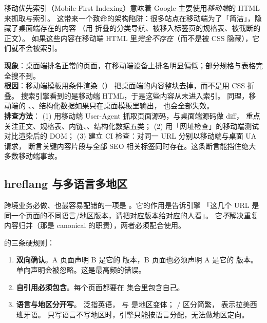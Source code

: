 移动优先索引（Mobile-First Indexing）意味着 Google 主要使用\emph{移动端}的 HTML 来抓取与索引。
这带来一个致命的架构陷阱：很多站点在移动端为了「简洁」，隐藏了桌面端存在的内容
（用  折叠的分类导航、被移入标签页的规格表、被截断的正文）。
如果这些内容在移动端 HTML 里\emph{完全不存在}（而不是被 CSS 隐藏），它们就不会被索引。

\begin{pitfall}
\textbf{现象}：桌面端排名正常的页面，在移动端设备上排名明显偏低；部分规格与表格完全搜不到。\\
\textbf{根因}：移动端模板用条件渲染（）
把桌面端的内容整块去掉，而不是用 CSS 折叠。
搜索引擎看到的是移动端 HTML，于是这些内容从未进入索引。
同理，移动端的 、、结构化数据如果只在桌面模板里输出，
也会全部失效。\\
\textbf{排查方法}：
(1) 用移动端 User-Agent 抓取页面源码，与桌面端源码做 diff，
      重点关注正文、规格表、内链、、结构化数据五类；
(2) 用「网址检查」的移动端测试对比渲染后的 DOM；
(3) 建立 CI 检查：对同一 URL 分别以移动端与桌面 UA 请求，
      断言关键内容片段与全部 SEO 相关标签同时存在。这条断言能挡住绝大多数移动端事故。
\end{pitfall}

\subsection{hreflang 与多语言多地区}

跨境业务必做、也最容易配错的一项是 。它的作用是告诉引擎
「这几个 URL 是同一个页面的不同语言/地区版本，请把对应版本给对应的人看」。
它\emph{不}解决重复内容归并（那是 canonical 的职责），两者必须配合使用。

 的三条硬规则：

\begin{enumerate}
  \item \textbf{双向确认}。A 页面声明 B 是它的  版本，B 页面也必须声明 A 是它的  版本。
        单向声明会被忽略。这是最高频的错误。
  \item \textbf{自引用必须包含}。每个页面都要在  集合里包含自己。
  \item \textbf{语言与地区分开写}。 泛指英语， 与  是地区变体；
         /  区分简繁， 表示拉美西班牙语。
        只写语言不写地区时，引擎只能按语言分配，无法做地区定向。
\end{enumerate}

